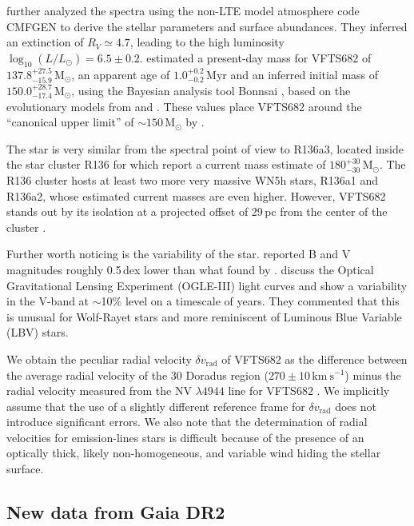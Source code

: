 \documentclass[apjl,twocolumn]{emulateapj}
\newcommand{\kms}{{\,\mathrm{km\ s^{-1}}}}
\newcommand{\Msun}{{\,\mathrm{M}_\odot}}
\begin{document}
\citet{bestenlehner:11} further analyzed the spectra using the non-LTE
model atmosphere code CMFGEN \citep{hillier:98} to derive the stellar
parameters and surface abundances. They inferred an extinction
of $R_V\simeq4.7$, leading to the high luminosity
$\log_{10}(L/L_\odot) =  6.5\pm0.2$. \citet{schneider:18} estimated
a present-day mass for VFTS682 of $137.8^{+27.5}_ {-15.9}\Msun$, an
apparent age of $1.0^{+0.2}_{-0.2}$\,Myr and an inferred initial mass
of $150.0^{+28.7}_{-17.4}\Msun$, using the Bayesian analysis tool Bonnsai
\citep{schneider:17}, based on the evolutionary models from
\citet{brott:11} and \cite{kohler:15}. These values place VFTS682 around the
``canonical upper limit'' of $\sim$$150\Msun$ by \citet{figer:05}.

The star is very similar from the spectral point of view to R136a3, located inside the star cluster
R136 \citep{crowther:10}  for which \citet{crowther:16} report a
current mass estimate of $180^{+30}_{-30}\Msun$. The R136 cluster hosts
at least two more very massive WN5h stars, R136a1 and R136a2, whose
estimated current masses are even higher. However, VFTS682 stands
out by its isolation at a projected offset of 29\,pc from the center
of the cluster \citep{bestenlehner:11}.  

Further worth noticing is the variability of the
star. \citet{parker:93} reported B and V magnitudes roughly 0.5\,dex
lower than what found by \citet{evans:11}. \citet{bestenlehner:11} discuss the Optical Gravitational Lensing
Experiment (OGLE-III) light curves \citep{udalski:08} and show a
variability in the V-band at $\sim$10\% level on a timescale of years.
They commented that this is unusual for Wolf-Rayet stars and more reminiscent
of Luminous Blue Variable (LBV) stars. 

We obtain the peculiar radial velocity $\delta v_\mathrm{rad}$ of VFTS682 as the difference
between the average radial velocity of the 30 Doradus region
($270\pm10\kms$) minus the radial velocity measured from the NV $\lambda4944$
line for VFTS682  \citep[$300\pm10\kms$, ][]{bestenlehner:11}. We implicitly assume that the use
of a slightly different reference frame for $\delta v_\mathrm{rad}$ does not
introduce significant errors. We also note that the determination of
radial velocities for emission-lines stars is difficult because of the
presence of an optically thick, likely non-homogeneous, and variable
wind hiding the stellar surface. 

\subsection{New data from Gaia DR2  \label{data:gaia}}
\end{document}
